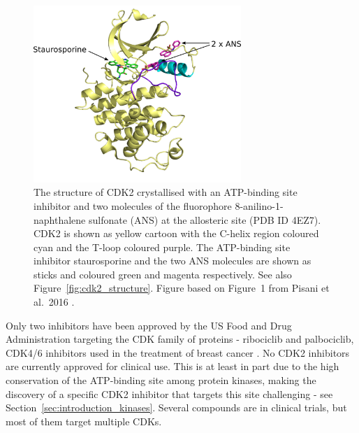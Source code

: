 \begin{figure}
\centering

\includegraphics[width=0.7\textwidth]{figures/cdk2_intro/cdk2_intro}

\caption[Structure of CDK2]
{The structure of CDK2 crystallised with an ATP-binding site inhibitor and two molecules of the fluorophore 8-anilino-1-naphthalene sulfonate (ANS) at the allosteric site (PDB ID 4EZ7).
CDK2 is shown as yellow cartoon with the \textalpha C-helix region coloured cyan and the T-loop coloured purple.
The ATP-binding site inhibitor staurosporine and the two ANS molecules are shown as sticks and coloured green and magenta respectively.
See also Figure~\ref{fig:cdk2_structure}.
Figure based on Figure~1 from Pisani et al.\ 2016 \cite{Pisani2016}.}

\label{fig:cdk2_intro}
\end{figure}


Only two inhibitors have been approved by the US Food and Drug Administration targeting the CDK family of proteins - ribociclib and palbociclib, CDK4/6 inhibitors used in the treatment of breast cancer \cite{Hortobagyi2016}.
No CDK2 inhibitors are currently approved for clinical use.
This is at least in part due to the high conservation of the ATP-binding site among protein kinases, making the discovery of a specific CDK2 inhibitor that targets this site challenging - see Section~\ref{sec:introduction_kinases}.
Several compounds are in clinical trials, but most of them target multiple CDKs.

